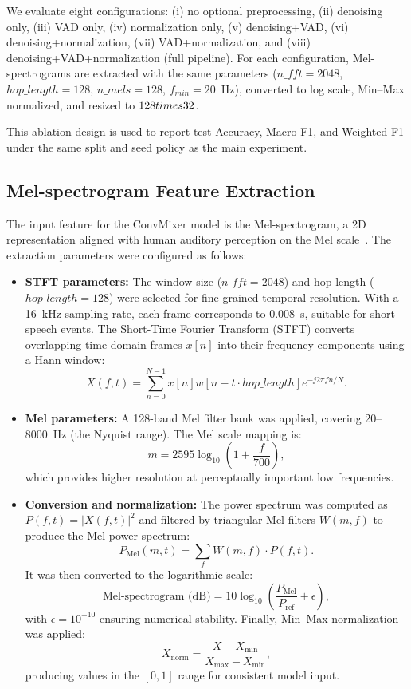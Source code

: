 We evaluate eight configurations: (i) no optional preprocessing, (ii) denoising only, (iii) VAD only, (iv) normalization only, (v) denoising+VAD, (vi) denoising+normalization, (vii) VAD+normalization, and (viii) denoising+VAD+normalization (full pipeline). For each configuration, Mel-spectrograms are extracted with the same parameters ($n\_fft=2048$, $hop\_length=128$, $n\_{mels}=128$, $f_{min}=20$~Hz), converted to log scale, Min--Max normalized, and resized to $128\\times32$.

This ablation design is used to report test Accuracy, Macro-F1, and Weighted-F1 under the same split and seed policy as the main experiment.



\subsection*{Mel-spectrogram Feature Extraction}

The input feature for the ConvMixer model is the Mel-spectrogram, a 2D representation aligned with human auditory perception on the Mel scale~\cite{Stevens1937MelScale}. The extraction parameters were configured as follows\cite{mcfee2015,Park_2019}:

\begin{itemize}

\item \textbf{STFT parameters:}  
The window size ($n\_fft = 2048$) and hop length ($hop\_length = 128$) were selected for fine-grained temporal resolution. With a 16~kHz sampling rate, each frame corresponds to 0.008~s, suitable for short speech events.  
The Short-Time Fourier Transform (STFT) converts overlapping time-domain frames $x[n]$ into their frequency components using a Hann window:
\[
X(f, t) = \sum_{n=0}^{N-1} x[n] w[n - t \cdot hop\_length] e^{-j 2 \pi f n / N}.
\]

\item \textbf{Mel parameters:}  
A 128-band Mel filter bank was applied, covering 20–8000~Hz (the Nyquist range). The Mel scale mapping is:
\[
m = 2595 \log_{10}\left(1 + \frac{f}{700}\right),
\]
which provides higher resolution at perceptually important low frequencies.

\item \textbf{Conversion and normalization:}  
The power spectrum was computed as $P(f, t) = |X(f, t)|^2$ and filtered by triangular Mel filters $W(m, f)$ to produce the Mel power spectrum:
\[
P_{\text{Mel}}(m, t) = \sum_f W(m, f) \cdot P(f, t).
\]
It was then converted to the logarithmic scale:
\[
\text{Mel-spectrogram (dB)} = 10 \log_{10}\left(\frac{P_{\text{Mel}}}{P_{\text{ref}}} + \epsilon\right),
\]
with $\epsilon = 10^{-10}$ ensuring numerical stability.  
Finally, Min–Max normalization was applied:
\[
X_{\text{norm}} = \frac{X - X_{\min}}{X_{\max} - X_{\min}},
\]
producing values in the $[0, 1]$ range for consistent model input.

\end{itemize}


